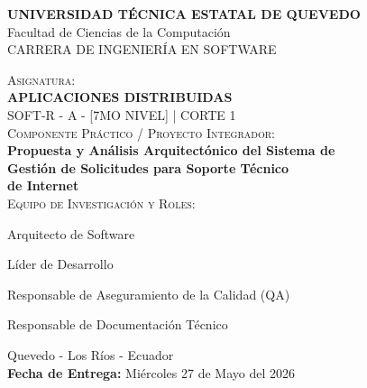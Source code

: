 \documentclass[12pt,letterpaper]{article}
\begin{document}
\begin{titlepage}
    \centering
    
    {\Large\bfseries UNIVERSIDAD TÉCNICA ESTATAL DE QUEVEDO} \\[0.4cm]
    {\large Facultad de Ciencias de la Computación
} \\[0.2cm]
    {\large CARRERA DE INGENIERÍA EN SOFTWARE} \\[0.8cm]
    
    \vspace{0.5cm}
    
    {\scshape Asignatura:} \\[0.1cm]
    {\large\bfseries APLICACIONES DISTRIBUIDAS} \\[0.2cm]
    {\small SOFT-R - A - [7MO NIVEL] \quad | \quad CORTE 1} \\[1.5cm]
    
    {\scshape Componente Práctico / Proyecto Integrador:} \\[0.3cm]
    {\Large\bfseries Propuesta y Análisis Arquitectónico del Sistema de\\ Gestión de Solicitudes para Soporte Técnico\\ de Internet} \\[1cm]
    
    {\scshape Equipo de Investigación y Roles:} \\[0.2cm]
    \begin{flushleft}
        \large
        \begin{description}[leftmargin=2cm, labelstyle=bfseries]
            \item[Pacheco:] Arquitecto de Software
            \item[Carpio:] Líder de Desarrollo
            \item[Alvarez:] Responsable de Aseguramiento de la Calidad (QA)
            \item[Cando:] Responsable de Documentación Técnico
        \end{description}
    \end{flushleft}
    
    \vfill
    
    {\large Quevedo - Los Ríos - Ecuador} \\[0.2cm]
    {\large \textbf{Fecha de Entrega:} Miércoles 27 de Mayo del 2026}
    
\end{titlepage}
\end{document}
